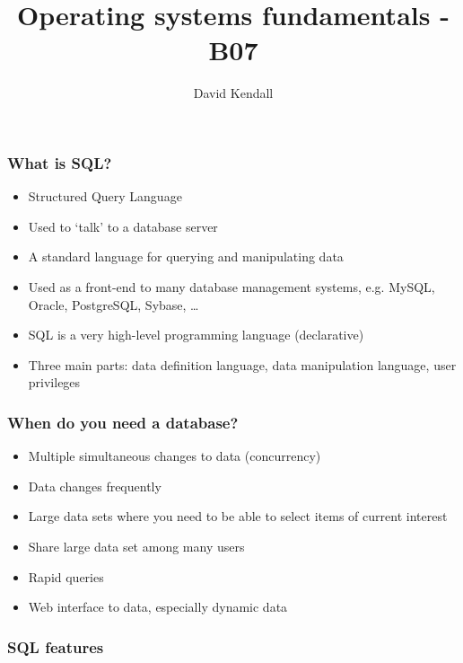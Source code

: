 \documentclass[hyperref={pdfpagelabels=false},svgnames,xcolor=table]{beamer}
\title{Operating systems fundamentals - B07}
\subtitle{}
\author{David Kendall}
\institute{Northumbria University}
\date{}
\begin{document}
\begin{frame}
\titlepage%
\end{frame}

\begin{frame}
\frametitle{What is SQL?}
\begin{itemize}
  \item Structured Query Language
  \item Used to `talk' to a database server
  \item A standard language for querying and manipulating data
  \item Used as a front-end to many database management systems, e.g.
    MySQL, Oracle, PostgreSQL, Sybase, \ldots
  \item SQL is a very high-level programming language (declarative)
  \item Three main parts: data definition language, data manipulation 
    language, user privileges
\end{itemize}
\end{frame}

\begin{frame}
  \frametitle{When do you need a database?}
  \begin{itemize}
    \item Multiple simultaneous changes to data (concurrency)
    \item Data changes frequently
    \item Large data sets where you need to be able to select items
      of current interest
    \item Share large data set among many users
    \item Rapid queries
    \item Web interface to data, especially dynamic data
  \end{itemize}
\end{frame}

\begin{frame}
  \frametitle{SQL features}
\end{frame}
\end{document}
